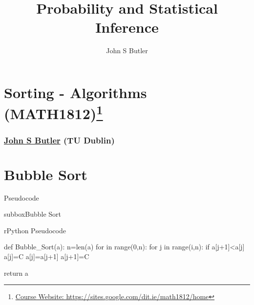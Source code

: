 \documentclass[10pt,a4paper]{article}
\title{Probability and Statistical Inference}
\author{John S Butler}
\begin{document}
\thispagestyle{empty}
\scriptsize


\section*{Sorting - Algorithms  (MATH1812)\footnote{\href{https://sites.google.com/dit.ie/math1812/home}{Course Website: https://sites.google.com/dit.ie/math1812/home}}}
\subsubsection*{\href{johnsbutler.netlify.com}{John S Butler} (TU Dublin) }


\section*{Bubble Sort}
\begin{textbox}{Pseudocode}
\begin{subbox}{subbox}{Bubble Sort}
\begin{codebox}{r}{Python Pseudocode}

def Bubble_Sort(a):
n=len(a)
for in range(0,n):
	for j in range(i,n):
		if a[j+1]<a[j]
			a[j]=C
			a[j]=a[j+1]
			a[j+1]=C

    return a
\end{codebox}
\end{subbox}
\end{textbox}
\end{document}
